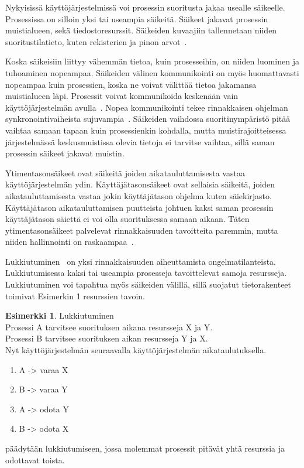 \documentclass[finnish]{tktltiki2}
\theoremstyle{definition}
\newtheorem{esim}[lau]{Esimerkki}
\theoremstyle{remark}
\begin{document}
Nykyisissä käyttöjärjestelmissä voi prosessin suoritusta jakaa usealle
säikeelle. Prosessissa on silloin yksi tai useampia säikeitä.
Säikeet jakavat prosessin muistialueen, sekä tiedostoresurssit.
Säikeiden kuvaajiin
tallennetaan niiden suoritustilatieto,
kuten rekisterien ja pinon arvot~\cite{stallings_operating_2018}.

Koska säikeisiin liittyy vähemmän tietoa, kuin prosesseihin,
on niiden luominen ja tuhoaminen nopeampaa. Säikeiden välinen
kommunikointi on myös huomattavasti nopeampaa kuin prosessien, koska
ne voivat välittää tietoa jakamansa muistialueen läpi.
Prosessit voivat kommunikoida keskenään vain käyttöjärjestelmän
avulla~\cite{stallings_operating_2018}.
Nopea
kommunikointi tekee rinnakkaisen ohjelman synkronointivaiheista
sujuvampia~\cite{stallings_operating_2018}. Säikeiden vaihdossa suoritinympäristö pitää vaihtaa
samaan tapaan kuin prosessienkin kohdalla, mutta muistirajoitteisessa 
järjestelmässä keskusmuistissa olevia
tietoja ei tarvitse vaihtaa, sillä saman prosessin säikeet jakavat
muistin.

Ytimentasonsäikeet ovat säikeitä joiden aikatauluttamisesta vastaa
käyttöjärjestelmän ydin. Käyttäjätasonsäikeet ovat sellaisia säikeitä,
joiden aikatauluttamisesta vastaa jokin käyttäjätason ohjelma kuten
säiekirjasto. Käyttäjätason aikatauluttamisen puutteista johtuen
kaksi saman prosessin käyttäjätason säiettä ei voi olla suorituksessa
samaan aikaan. Täten ytimentasonsäikeet palvelevat rinnakkaisuuden tavoitteita
paremmin, mutta niiden hallinnointi on raskaampaa~\cite{stallings_operating_2018}.

Lukkiutuminen~\cite{stallings_operating_2018}
on yksi rinnakkaisuuden aiheuttamista ongelmatilanteista.
Lukkiutumisessa kaksi tai useampia prosesseja tavoittelevat samoja resursseja.
Lukkiutuminen voi tapahtua myös säikeiden välillä, sillä
suojatut tietorakenteet toimivat Esimerkin 1 resurssien tavoin.

\begin{center}
\begin{esim}
 Lukkiutuminen \\
 Prosessi A tarvitsee suorituksen aikana resursseja X ja Y. \\
 Prosessi B tarvitsee suorituksen aikan resursseja Y ja X. \\
 Nyt käyttöjärjestelmän seuraavalla käyttöjärjestelmän aikataulutuksella.
 \begin{enumerate}
  \item A -> varaa X
  \item B -> varaa Y
  \item A -> odota Y
  \item B -> odota X 
 \end{enumerate}
 päädytään lukkiutumiseen, jossa molemmat prosessit
 pitävät yhtä resurssia ja odottavat toista.
\end{esim}
\end{center}
\end{document}
